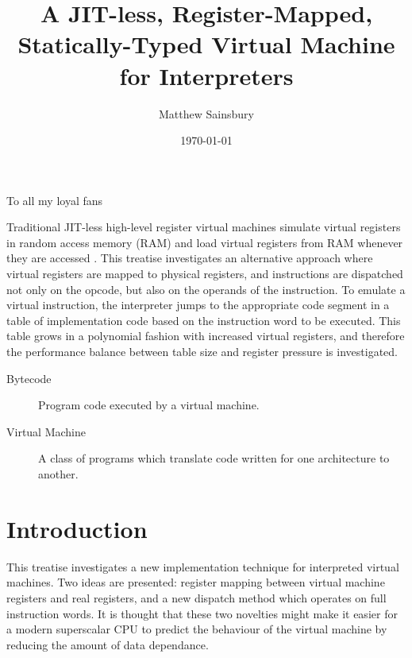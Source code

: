 



\title{A JIT-less, Register-Mapped, Statically-Typed Virtual Machine for Interpreters}
\author{Matthew Sainsbury}
\date{\today}

\begin{titlepage}

		\maketitle
	
\end{titlepage}


	To all my loyal fans

	Traditional JIT-less high-level register virtual machines simulate virtual registers in random access memory (RAM) and load virtual registers from RAM whenever they are accessed \citep{caseregistervm}. This treatise investigates an alternative approach where virtual registers are mapped to physical registers, and instructions are dispatched not only on the opcode, but also on the operands of the instruction. To emulate a virtual instruction, the interpreter jumps to the appropriate code segment in a table of implementation code based on the instruction word to be executed. This table grows in a polynomial fashion with increased virtual registers, and therefore the performance balance between table size and register pressure is investigated.



\tableofcontents

\begin{description}
	\item[Bytecode] Program code executed by a virtual machine.
	\item[Virtual Machine] A class of programs which translate code written for one architecture to another.
\end{description}


\chapter{Introduction}
	\startrealnumbers
	This treatise investigates a new implementation technique for interpreted virtual machines. Two ideas are presented: register mapping between virtual machine registers and real registers, and a new dispatch method which operates on full instruction words. It is thought  that these two novelties might make it easier for a modern superscalar CPU to predict the behaviour of the virtual machine by reducing the amount of data dependance.
	
